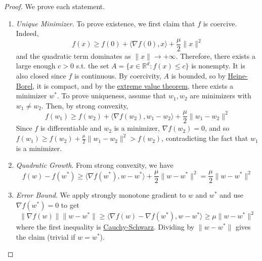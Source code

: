 	\begin{proof}
		We prove each statement. 
		\begin{enumerate}
		  \item \textit{Unique Minimizer}. To prove existence, we first claim that $f$ is coercive. Indeed, 
				\begin{equation}
					f(x) \geq f(0) + \langle \nabla f(0), x \rangle + \frac{\mu}{2} \|x\|^2
				\end{equation}
				and the quadratic term dominates as $\|x\| \to +\infty$. Therefore, there exists a large enough $c > 0$ s.t. the set $A = \{ x \in \mathbb{R}^d \colon f(x) \leq c \}$ is nonempty. It is also closed since $f$ is continuous. By coercivity, $A$ is bounded, so by \hyperref[real-thm:heine-borel]{Heine-Borel}, it is compact, and by the \hyperref[real-thm:extreme-value-theorem]{extreme value theorem}, there exists a minimizer $w^\ast$. To prove uniqueness, assume that $w_1, w_2$ are minimizers with $w_1 \neq w_2$. Then, by strong convexity, 
				\begin{equation}
					f(w_1) \geq f(w_2) + \langle \nabla f(w_2), w_1 - w_2 \rangle + \frac{\mu}{2} \|w_1 - w_2\|^2
				\end{equation}
				Since $f$ is differentiable and $w_2$ is a minimizer, $\nabla f(w_2) = 0$, and so $f(w_1) \geq f(w_2) + \frac{\mu}{2} \|w_1 - w_2\|^2 > f(w_2)$, contradicting the fact that $w_1$ is a minimizer. 

			\item \textit{Quadratic Growth}. From strong convexity, we have 
				\begin{equation}
					f(w) - f(w^\ast) \geq \langle \nabla f(w^\ast), w - w^\ast \rangle + \frac{\mu}{2} \|w - w^\ast\|^2 = \frac{\mu}{2} \|w - w^\ast\|^2
				\end{equation}

			\item \textit{Error Bound}. We apply strongly monotone gradient to $w$ and $w^\ast$ and use $\nabla f(w^\ast) = 0$ to get 
				\begin{equation}
					\|\nabla f(w)\| \|w - w^\ast\| \geq \langle \nabla f(w) - \nabla f(w^\ast), w - w^\ast \rangle \geq \mu \|w - w^\ast\|^2
				\end{equation}
				where the first inequality is \hyperref[lin-thm:cauchy-schwarz-inequality]{Cauchy-Schwarz}. Dividing by $\|w - w^\ast\|$ gives the claim (trivial if $w = w^\ast$). 
		\end{enumerate}
	\end{proof}

